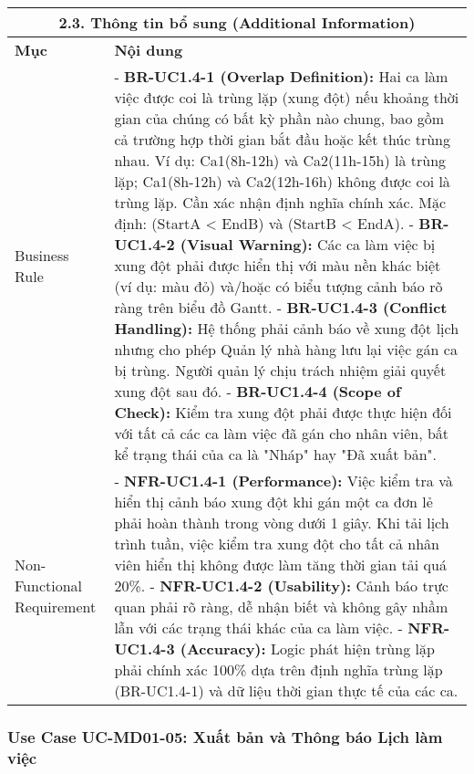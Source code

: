 \begin{longtable}{|m{4cm}|p{11cm}|}
\hline
\multicolumn{2}{|c|}{\textbf{2.3. Thông tin bổ sung (Additional Information)}} \\
\hline
\textbf{Mục} & \textbf{Nội dung} \\
\hline
Business Rule & - \textbf{BR-UC1.4-1 (Overlap Definition):} Hai ca làm việc được coi là trùng lặp (xung đột) nếu khoảng thời gian của chúng có bất kỳ phần nào chung, bao gồm cả trường hợp thời gian bắt đầu hoặc kết thúc trùng nhau. Ví dụ: Ca1(8h-12h) và Ca2(11h-15h) là trùng lặp; Ca1(8h-12h) và Ca2(12h-16h) không được coi là trùng lặp. Cần xác nhận định nghĩa chính xác. Mặc định: (StartA < EndB) và (StartB < EndA). \newline - \textbf{BR-UC1.4-2 (Visual Warning):} Các ca làm việc bị xung đột phải được hiển thị với màu nền khác biệt (ví dụ: màu đỏ) và/hoặc có biểu tượng cảnh báo rõ ràng trên biểu đồ Gantt. \newline - \textbf{BR-UC1.4-3 (Conflict Handling):} Hệ thống phải cảnh báo về xung đột lịch nhưng cho phép Quản lý nhà hàng lưu lại việc gán ca bị trùng. Người quản lý chịu trách nhiệm giải quyết xung đột sau đó. \newline - \textbf{BR-UC1.4-4 (Scope of Check):} Kiểm tra xung đột phải được thực hiện đối với tất cả các ca làm việc đã gán cho nhân viên, bất kể trạng thái của ca là "Nháp" hay "Đã xuất bản". \\
\hline
Non-Functional Requirement & - \textbf{NFR-UC1.4-1 (Performance):} Việc kiểm tra và hiển thị cảnh báo xung đột khi gán một ca đơn lẻ phải hoàn thành trong vòng dưới 1 giây. Khi tải lịch trình tuần, việc kiểm tra xung đột cho tất cả nhân viên hiển thị không được làm tăng thời gian tải quá 20\%. \newline - \textbf{NFR-UC1.4-2 (Usability):} Cảnh báo trực quan phải rõ ràng, dễ nhận biết và không gây nhầm lẫn với các trạng thái khác của ca làm việc. \newline - \textbf{NFR-UC1.4-3 (Accuracy):} Logic phát hiện trùng lặp phải chính xác 100\% dựa trên định nghĩa trùng lặp (BR-UC1.4-1) và dữ liệu thời gian thực tế của các ca. \\
\hline

\end{longtable}

\subsubsection{Use Case UC-MD01-05: Xuất bản và Thông báo Lịch làm việc}


